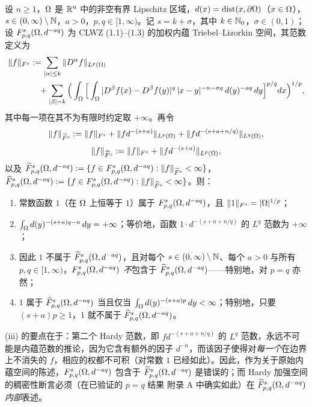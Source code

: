 \begin{theorem}
设 $n\ge1$，$\Omega$ 是 $\mathbb{R}^n$ 中的非空有界 Lipschitz 区域，$d(x)=\operatorname{dist}(x,\partial\Omega)$（$x\in\Omega$），$s\in(0,\infty)\setminus\mathbb{N}$，$a>0$，$p,q\in[1,\infty)$。记 $s=k+\sigma$，其中 $k\in\mathbb{N}_0$，$\sigma\in(0,1)$；设 $F^{s}_{p,q}(\Omega,d^{-aq})$ 为 CLWZ (1.1)--(1.3) 的加权内蕴 Triebel--Lizorkin 空间，其范数定义为
\begin{equation}\label{eq:sec6-f1-norm}
  \begin{split}
    \|f\|_{F^s}
    &:=\sum_{|\alpha|\le k}\|D^\alpha f\|_{L^p(\Omega)}\\
    &\quad+\sum_{|\beta|=k}\Big(\int_\Omega\Big[\int_\Omega|D^\beta f(x)-D^\beta f(y)|^q\,|x-y|^{-n-\sigma q}\,d(y)^{-aq}\,dy\Big]^{p/q}dx\Big)^{1/p},
  \end{split}
\end{equation}
其中每一项在其不为有限时约定取 $+\infty$。再令
\begin{equation}\label{eq:sec6-f1-tildenorm}
  \|f\|_{\widetilde F^s}:=\|f\|_{F^s}+\|f d^{-(s+a)}\|_{L^p(\Omega)}+\|f d^{-(s+a+n/q)}\|_{L^q(\Omega)},
\end{equation}
\begin{equation}\label{eq:sec6-f1-hatnorm}
  \|f\|_{\widehat F^s}:=\|f\|_{F^s}+\|f d^{-(s+a)}\|_{L^p(\Omega)},
\end{equation}
以及 $\widetilde F^{s}_{p,q}(\Omega,d^{-aq}):=\{f\in F^{s}_{p,q}(\Omega,d^{-aq}):\|f\|_{\widetilde F^s}<\infty\}$，$\widehat F^{s}_{p,q}(\Omega,d^{-aq}):=\{f\in F^{s}_{p,q}(\Omega,d^{-aq}):\|f\|_{\widehat F^s}<\infty\}$。则：
\begin{enumerate}[label=(\roman*)]
  \item 常数函数 $1$（在 $\Omega$ 上恒等于 $1$）属于 $F^{s}_{p,q}(\Omega,d^{-aq})$，且 $\|1\|_{F^s}=|\Omega|^{1/p}$；
  \item $\int_\Omega d(y)^{-(s+a)q-n}\,dy=+\infty$；等价地，函数 $1\cdot d^{-(s+a+n/q)}$ 的 $L^q$ 范数为 $+\infty$；
  \item 因此 $1$ 不属于 $\widetilde F^{s}_{p,q}(\Omega,d^{-aq})$，且对每个 $s\in(0,\infty)\setminus\mathbb{N}$、每个 $a>0$ 与所有 $p,q\in[1,\infty)$，$F^{s}_{p,q}(\Omega,d^{-aq})$ \emph{不}包含于 $\widetilde F^{s}_{p,q}(\Omega,d^{-aq})$——特别地，对 $p=q$ 亦然；
  \item $1$ 属于 $\widehat F^{s}_{p,q}(\Omega,d^{-aq})$ 当且仅当 $\int_\Omega d(y)^{-(s+a)p}\,dy<\infty$；特别地，只要 $(s+a)p\ge1$，$1$ 就不属于 $\widehat F^{s}_{p,q}(\Omega,d^{-aq})$。
\end{enumerate}
(iii) 的要点在于：第二个 Hardy 范数，即 $f d^{-(s+a+n/q)}$ 的 $L^q$ 范数，永远不可能是内蕴范数的推论，因为它含有额外的因子 $d^{-n}$，而该因子使得对\emph{每一个}在边界上不消失的 $f$，相应的权都不可积（对常数 $1$ 已经如此）。因此，作为关于原始内蕴空间的陈述，$F^{s}_{p,q}(\Omega,d^{-aq})$ 包含于 $\widetilde F^{s}_{p,q}(\Omega,d^{-aq})$ 是错误的；而 Hardy 加强空间的稠密性断言必须（在已验证的 $p=q$ 结果 附录 A 中确实如此）在 $\widetilde F^{s}_{p,q}(\Omega,d^{-aq})$ \emph{内部}表述。
\end{theorem}

